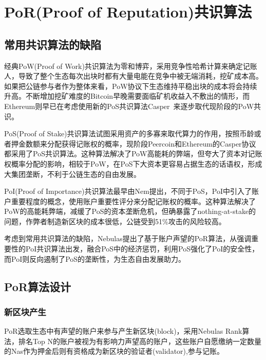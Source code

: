 \section{PoR(Proof of Reputation)共识算法}
\label{sec:por}

\subsection{常用共识算法的缺陷}
\label{por:weakness}

经典PoW(Proof of
Work)共识算法为零和博弈，采用竞争性哈希计算来确定记账人，导致了整个生态每次出块时都有大量电能在竞争中被无端消耗，挖矿成本高。如果把公链参与者作为整体来看，PoW协议下生态维持平稳出块的成本将会持续升高。不断增加挖矿难度的Bitcoin早晚需要面临矿机收益入不敷出的情形，而Ethereum则早已在考虑使用新的PoS共识算法Casper~\cite{casper}来逐步取代现阶段的PoW共识\cite{buterin2013ethereum}。

PoS(Proof of Stake)共识算法试图采用资产的多寡来取代算力的作用，按照币龄或者押金数额来分配获得记账权的概率，现阶段Peercoin\cite{king2012peercoin}和Ethereum的Casper协议都采用了PoS共识算法。这种算法解决了PoW高能耗的弊端，但夸大了资本对记账权概率分配的影响，相较于PoW，在PoS下大资本更容易占据生态的话语权，形成大集团垄断，不利于公链生态的自由发展。

PoI(Proof of Importance)共识算法最早由Nem提出\cite{nem}，不同于PoS，PoI中引入了账户重要程度的概念，使用账户重要性评分来分配记账权的概率。这种算法解决了PoW的高能耗弊端，减缓了PoS的资本垄断危机，但确暴露了nothing-at-stake的问题，作弊者制造新区块的成本很低，公链受到51\%攻击的风险较高。

考虑到常用共识算法的缺陷，Nebulas提出了基于账户声望的PoR算法，从强调重要性的PoI共识算法出发，融合PoS中的经济惩罚，利用PoS强化了PoI的安全性，而PoI则反向遏制了PoS的垄断性，为生态自由发展助力。

\subsection{PoR算法设计}
\label{por:design}

\subsubsection{新区块产生}
\label{por:design:block}

PoR选取生态中有声望的账户来参与产生新区块(block)，采用Nebulas Rank算法，排名Top N的账户被视为有影响力声望高的账户，这些账户自愿缴纳一定数量的Nas作为押金后则有资格成为新区块的验证者(validator),参与记账。

